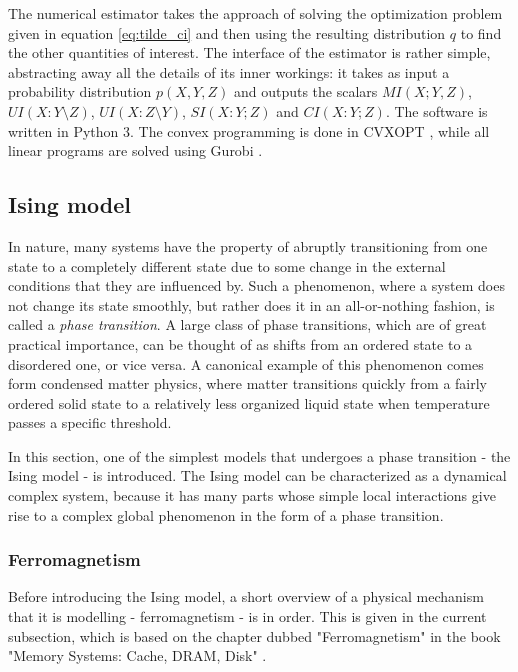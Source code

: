 \documentclass[12pt]{article}
\begin{document}
The numerical estimator takes the approach of solving the optimization problem given in equation \ref{eq:tilde_ci} and then using the resulting distribution $q$ to find the other quantities of interest. The interface of the estimator is rather simple, abstracting away all the details of its inner workings: it takes as input a  probability distribution $p(X, Y, Z)$ and outputs the scalars $MI(X;Y,Z)$, $UI(X:Y \setminus Z)$, $UI(X:Z \setminus Y)$, $SI(X:Y;Z)$ and $CI(X:Y;Z)$. The software is written in Python 3. The convex programming is done in CVXOPT \cite{cvxopt}, while all linear programs are solved using Gurobi \cite{gurobi}. 

\subsection{Ising model}

In nature, many systems have the property of abruptly transitioning from one state to a completely different state due to some change in the external conditions that they are influenced by. Such a phenomenon, where a system does not change its state smoothly, but rather does it in an all-or-nothing fashion, is called a \textit{phase transition}. A large class of phase transitions, which are of great practical importance, can be thought of as shifts from an ordered state to a disordered one, or vice versa. A canonical example of this phenomenon comes form condensed matter physics, where matter transitions quickly from a fairly ordered solid state to a relatively less organized liquid state when temperature passes a specific threshold.\cite{inf-flow-ising-commentary}

In this section, one of the simplest models that undergoes a phase transition - the Ising model - is introduced. The Ising model can be characterized as a dynamical complex system, because it has many parts whose simple local interactions give rise to a complex global phenomenon in the form of a phase transition. 

\subsubsection{Ferromagnetism}

Before introducing the Ising model, a short overview of a physical mechanism that it is modelling - ferromagnetism - is in order. This is given in the current subsection, which is based on the chapter dubbed "Ferromagnetism" in the book "Memory Systems: Cache, DRAM, Disk" \cite{memory-systems-cache-ram}.
\end{document}
